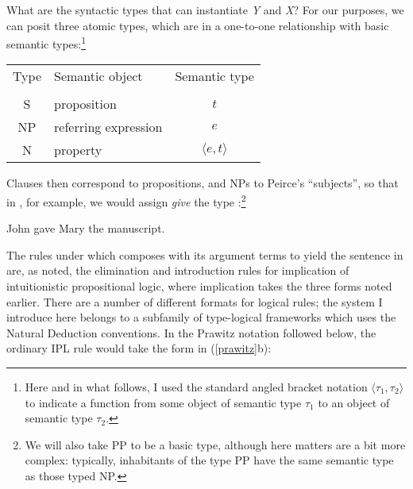 \documentclass[output=paper,colorlinks,citecolor=brown]{langscibook}
\begin{document}
What are the syntactic types that can instantiate \textit{Y} and \textit{X}? For our
purposes, we can posit three atomic types, which are in a
one-to-one relationship with basic semantic types:\footnote{Here and
in what follows, I used the standard angled bracket notation
$\langle\tau_1,\tau_2\rangle$ to indicate a function from some object
of semantic type $\tau_1$ to an object of semantic type $\tau_2$.}

\begin{exe}
 \ex\label{types}
\begin{tabular}{clc}
\textsf{Type} & \textsf{Semantic object} & \textsf{Semantic type} \\
 & & \\
S & proposition & $t$\\
NP & referring expression & $e$ \\
N  & property & $\langle e,t\rangle$ \\
\end{tabular}
\end{exe}
Clauses then correspond to propositions, and NPs to Peirce's
``subjects'', so that in , for example, we would assign \textit{give}
the type :\footnote{We will also take PP to be a basic type,
although here matters are a bit more complex: typically, inhabitants of
the type PP have the same semantic type as those typed NP.}


\begin{exe}
 \ex\label{example}
  \begin{xlist}
 \ex\label{examplea}
    John gave Mary the manuscript.
 \ex\label{exampleb}
  \end{xlist}
\end{exe}
The rules under which  composes with its argument terms to
yield the sentence in  are, as noted, the elimination and
introduction rules for implication of intuitionistic propositional
logic, where implication takes the three forms noted earlier. There
are a number of different formats for logical rules; the system I
introduce here belongs to a subfamily of type-logical frameworks which
uses the Natural Deduction conventions. In the Prawitz notation followed
below, the ordinary IPL rule would take the form in (\ref{prawitz}b):
\end{document}
